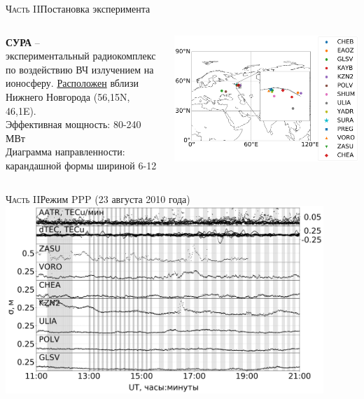 \begin{frame}{\textsc{Часть II}}{Постановка эксперимента}
\begin{columns}
\begin{column}{0.35\textwidth}
\centering
\textbf{СУРА} -- \\
экспериментальный радиокомплекс по воздействию ВЧ излучением на ионосферу. 
\href{https://clck.ru/NfWnc}{Расположен} вблизи Нижнего Новгорода (56,15\degree N, 46,1\degree E). \\ 
Эффективная мощность: 80-240 МВт \\
Диаграмма направленности: карандашной формы шириной 6-12\degree
\end{column}
\begin{column}{0.65\textwidth}
\includegraphics[width=\textwidth]{../fig/sites.png}  
\end{column}
\end{columns}
\end{frame}

\begin{frame}{\textsc{Часть II}}{Режим PPP (23 августа 2010 года)}
\centering
\includegraphics[width=0.9\textwidth]{../fig/src/ppp-2010-235.png}
\end{frame}

